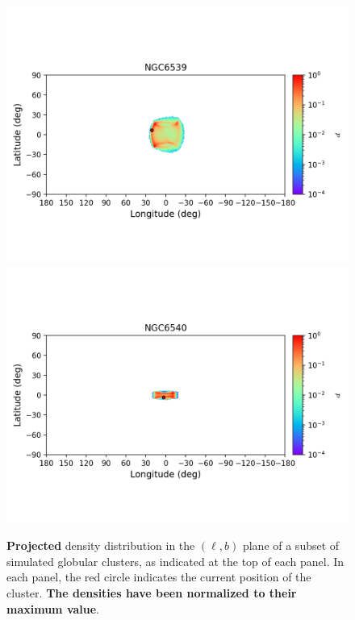\begin{figure}
        \includegraphics[clip=true, trim = 0mm 20mm 0mm 10mm, width=1\columnwidth]{images/error_plots_NGC6539.png}
        \includegraphics[clip=true, trim = 0mm 20mm 0mm 10mm, width=1\columnwidth]{images/error_plots_NGC6540.png}
        \caption[]{\textbf{Projected} density distribution in the $(\ell, b)$ plane of a subset of simulated globular clusters, as indicated at the top of each panel. In each panel, the red circle indicates the current position of the cluster. \textbf{The densities have been normalized to their maximum value}.}\label{stream12}
        \end{figure}
